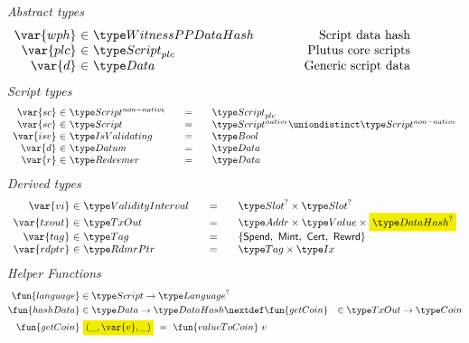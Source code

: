 \begin{figure*}[htb]
  \emph{Abstract types}
  \begin{equation*}
    \begin{array}{r@{~\in~}l@{\quad\quad\quad\quad}r}
      \var{wph} &\WitnessPPDataHash & \text{Script data hash}\\
      \var{plc} & \ScriptPlutus & \text{Plutus core scripts} \\
      \var{d} & \Data & \text{Generic script data}
    \end{array}
  \end{equation*}
  \emph{Script types}
  \begin{equation*}
    \begin{array}{r@{~\in~}l@{\qquad=\qquad}lr}
      \var{sc} & \ScriptNonNative & \ScriptPlutus \\
      \var{sc} & \Script & \ScriptNative \uniondistinct \ScriptNonNative \\
      \var{isv} & \IsValidating & \Bool \\
      \var{d} & \Datum & \Data \\
      \var{r} & \Redeemer & \Data
    \end{array}
  \end{equation*}
%
  \emph{Derived types}
  \begin{equation*}
    \begin{array}{r@{~\in~}l@{\qquad=\qquad}lr}
      \var{vi}
      & \ValidityInterval
      & \Slot^? \times \Slot^?
      \\
      \var{txout}
      & \TxOut
      & \Addr \times \Value \times \hldiff{\DataHash^?}
      \\
      \var{tag}
      & \Tag
      & \{\mathsf{Spend},~\mathsf{Mint},~\mathsf{Cert},~\mathsf{Rewrd}\}
      \\
      \var{rdptr}
      & \RdmrPtr
      & \Tag \times \Ix
    \end{array}
  \end{equation*}
  \emph{Helper Functions}
  \begin{align*}
    \fun{language}& \in \Script \to \Language^?\\
    \fun{hashData}& \in \Data \to \DataHash
    \nextdef
    \fun{getCoin}& \in \TxOut \to \Coin \\
    \fun{getCoin}&~\hldiff{{(\_, \var{v}, \_)}} ~=~\fun{valueToCoin}~{v}

\end{align*}
\end{figure*}
